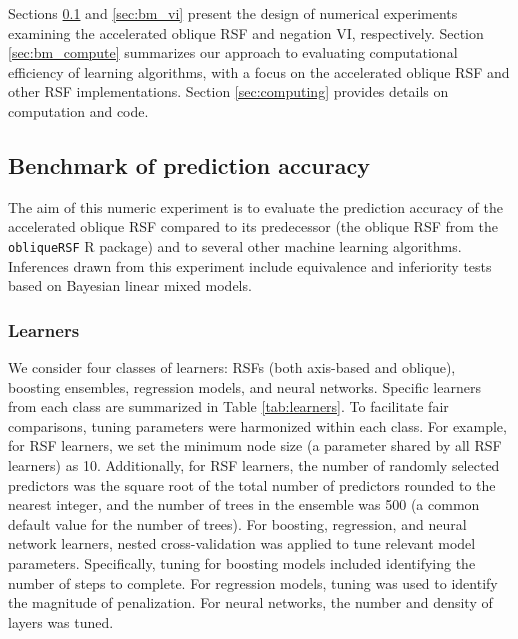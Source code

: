 \documentclass[12pt]{article}\usepackage[]{graphicx}\usepackage[]{xcolor}
\newcommand{\secref}[1]{Section \ref{#1}}
\newcommand{\tabref}[1]{Table \ref{#1}}
\begin{document}
Sections \ref{sec:bm_pred} and \ref{sec:bm_vi} present the design of numerical experiments examining the accelerated oblique RSF and negation VI, respectively. \secref{sec:bm_compute} summarizes our approach to evaluating computational efficiency of learning algorithms, with a focus on the accelerated oblique RSF and other RSF implementations. \secref{sec:computing} provides details on computation and code.

\subsection{Benchmark of prediction accuracy} \label{sec:bm_pred}

The aim of this numeric experiment is to evaluate the prediction accuracy of the accelerated oblique RSF compared to its predecessor (the oblique RSF from the \texttt{obliqueRSF} R package) and to several other machine learning algorithms. Inferences drawn from this experiment include equivalence and inferiority tests based on Bayesian linear mixed models.

\subsubsection{Learners} \label{sec:learners}

We consider four classes of learners: RSFs (both axis-based and oblique), boosting ensembles, regression models, and neural networks. Specific learners from each class are summarized in \tabref{tab:learners}. To facilitate fair comparisons, tuning parameters were harmonized within each class. For example, for RSF learners, we set the minimum node size (a parameter shared by all RSF learners) as 10. Additionally, for RSF learners, the number of randomly selected predictors was the square root of the total number of predictors rounded to the nearest integer, and the number of trees in the ensemble was 500 (a common default value for the number of trees). For boosting, regression, and neural network learners, nested cross-validation was applied to tune relevant model parameters. Specifically, tuning for boosting models included identifying the number of steps to complete. For regression models, tuning was used to identify the magnitude of penalization. For neural networks, the number and density of layers was tuned.
\end{document}
